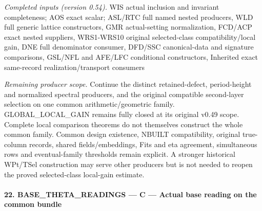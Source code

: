 \documentclass[11pt,a4paper]{article}
\numberwithin{equation}{section}
\theoremstyle{remark}\newtheorem{remark}[theorem]{Remark}
\begin{document}
\emph{Completed inputs (version 0.54).} WIS actual inclusion and invariant completeness; AOS exact scalar; ASL/RTC full named nested producers, WLD full generic lattice constructors, GMR actual-setting normalization, FCD/ACP exact nested suppliers, WRS1-WRS10 original selected-class compatibility/local gain, DNE full denominator consumer, DFD/SSC canonical-data and signature comparisons, GSL/NFL and AFE/LFC conditional constructors, Inherited exact same-record realization/transport consumers

\emph{Remaining producer scope.} Continue the distinct retained-defect, period-height and normalized spectral producers, and the original compatible second-layer selection on one common arithmetic/geometric family. GLOBAL\_\allowbreak LOCAL\_\allowbreak GAIN remains fully closed at its original v0.49 scope. Complete local comparison theorems do not themselves construct the whole common family. Common design existence, NBUILT compatibility, original true-column records, shared fields/embeddings, Fits and eta agreement, simultaneous rows and eventual-family thresholds remain explicit. A stronger historical WPt/TSel construction may serve other producers but is not needed to reopen the proved selected-class local-gain estimate.



\paragraph{22. BASE\_\allowbreak THETA\_\allowbreak READINGS — C — Actual base reading on the common bundle}
\end{document}
